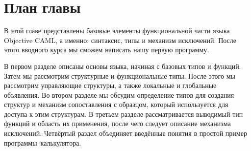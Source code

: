 \section{План главы}

В этой главе представлены базовые элементы функциональной части языка Objective
CAML, а именно: синтаксис, типы и механизм исключений. После этого вводного
курса мы сможем написать нашу первую программу.

В первом разделе описаны основы языка, начиная с базовых типов и функций. Затем
мы рассмотрим структурные и функциональные типы. После этого мы рассмотрим
управляющие структуры, а также локальные и глобальные объявления. Во втором
разделе мы обсудим определение типов для создания структур и механизм
сопоставления с образцом, который используется для доступа к этим структурам. В
третьем разделе рассматривается выводимый тип функций и область их применения,
после чего следует описание механизма исключений. Четвёртый раздел объединяет
введённые понятия в простой пример программы--калькулятора.

